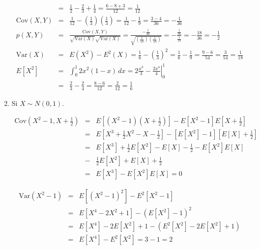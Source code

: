 \begin{enumerate}
\begin{eqnarray*}
   &=& \frac{1}{2} - \frac{2}{3}+ \frac{1}{4} = \frac{6-8+3}{12}= \frac{1}{12}\\
   \textrm{Cov} \left(X,Y \right)&=& \frac{1}{12} - \left(\frac{1}{3} \right)\left(\frac{1}{3} \right) = \frac{1}{12} - \frac{1}{9} = \frac{3-4}{36}= - \frac{1}{36}\\
   p \left(X,Y \right)&=& \frac{\textrm{Cov} \left(X,Y \right) }{\sqrt{\textrm{Var}\left(X \right)}\sqrt{\textrm{Var}\left(X \right) }} = \frac{-\frac{1}{36} }{\sqrt{\left( \frac{1}{18} \right)\left( \frac{1}{18} \right) }}= -\frac{\frac{1}{36} }{\frac{1}{18} }= -\frac{18}{36} = - \frac{1}{2}\\
   \textrm{Var} \left(X \right) &=& E \left(X^2 \right)- E^2 \left(X \right)= \frac{1}{6} - \left( \frac{1}{3} \right)^2 = \frac{1}{6} - \frac{1}{9} = \frac{9-6}{54}= \frac{3}{54}= \frac{1}{18}\\
 E \left[X ^2 \right]&=& \int _{0}^{1} 2x ^2 \left(1-x \right) \, dx = 2 \left. \frac{x^3}{3} - \frac{2x ^ 4}{4} \right| _{0}^{1}\\
 &=& \frac{2}{3}- \frac{2}{4}= \frac{8-6}{12}= \frac{2}{12} = \frac{1}{6}
\end{eqnarray*}

 \item Si $X \sim N \left(0,1 \right) $. 
 
 \begin{eqnarray*}
\textrm{Cov}\left(X^2-1 , X + \frac{1}{2} \right) &=& E \left[\left(X^2-1 \right) \left( X+ \frac{1}{2}\right) \right]- E \left[X^2-1 \right] E \left[X+ \frac{1}{2} \right]\\
&=& E   \left[X^3 + \frac{1}{2} X^2-X - \frac{1}{2} \right]- \left[ E \left[X^2 \right]-1 \right] \left[ E \left[ X \right]+ \frac{1}{2}\right]\\
&=& E \left[X^3 \right]+ \frac{1}{2} E \left[X^2 \right]- E \left[ X \right]- \frac{1}{2}- E \left[X^2 \right] E \left[X \right]\\
&-& \frac{1}{2} E \left[X^2 \right]+ E \left[X \right]+ \frac{1}{2}\\
&=& E \left[X^3 \right]- E \left[ X^2\right]E \left[X \right]=0
\end{eqnarray*}

\begin{eqnarray*}
\textrm{Var} \left(X^2 - 1  \right)&=& E \left[ \left(X^2 - 1 \right)^2 \right]- E ^2 \left[X^2 - 1 \right]\\
&=& E \left[ X^4 - 2X^2 + 1 \right] - \left(E \left[X^2 \right]-1 \right)^2\\
&=& E \left[X^4 \right]- 2E \left[X^2 \right]+1 - \left( E^2 \left[ X^2\right]- 2E \left[ X^2 \right]+1 \right)\\
&=& E \left[ X^4 \right]- E^2 \left[X^2 \right]= 3-1=2
\end{eqnarray*}


\end{enumerate}

